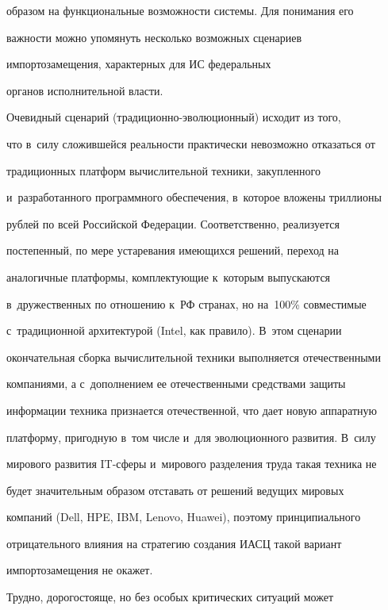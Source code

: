 образом на функциональные возможности системы. Для понимания его 


важности можно упомянуть несколько возможных сценариев 


импортозамещения, характерных для ИС федеральных 


органов исполнительной власти.


     


     Очевидный сценарий (тра\-ди\-ци\-он\-но-эво\-лю\-ци\-он\-ный) исходит из того, 


что в~силу сложившейся реальности практически невозможно отказаться от 


традиционных платформ вычислительной техники, закупленного 


и~разработанного программного обеспечения, в~которое вложены триллионы 


рублей по всей Российской Федерации. Соответственно, реализуется 


постепенный, по мере устаревания имеющихся решений, переход на 


аналогичные платформы, комплектующие к~которым выпускаются 


в~дружественных по отношению к~РФ странах, но на~100\% совместимые 


с~традиционной архитектурой (Intel, как правило). В~этом сценарии 


окончательная сборка вычислительной техники выполняется отечественными 


компаниями, а с~дополнением ее отечественными средствами защиты 


информации техника признается отечественной, что дает новую аппаратную 


платформу, пригодную в~том числе и~для эволюционного развития. В~силу 


мирового развития IT-сфе\-ры и~мирового разделения труда такая техника не 


будет значительным образом отставать от решений ведущих мировых 


компаний (Dell, HPE, IBM, Lenovo, Huawei), поэтому принципиального 


отрицательного влияния на стратегию создания ИАСЦ такой вариант 


импортозамещения не окажет.


     


     Трудно, дорогостояще, но без особых критических ситуаций может 


